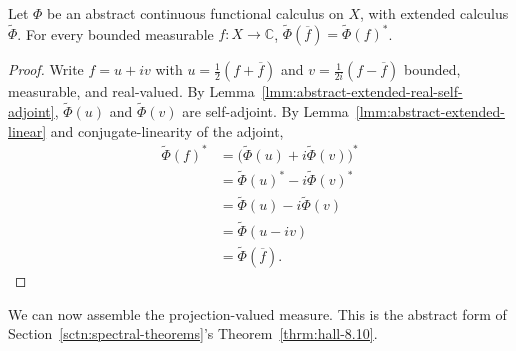 \begin{lemma}
    \label{lmm:abstract-extended-conjugation}
    \leanok
    Let $\Phi$ be an abstract continuous functional calculus on $X$, with extended calculus $\widetilde\Phi$. For every bounded measurable $f : X \to \mathbb{C}$, $\widetilde\Phi(\overline f) = \widetilde\Phi(f)^*$.
\end{lemma}
\begin{proof}
    \leanok
Write $f = u + iv$ with $u = \tfrac{1}{2}(f+\overline f)$ and $v = \tfrac{1}{2i}(f - \overline f)$ bounded, measurable, and real-valued. By Lemma~\ref{lmm:abstract-extended-real-self-adjoint}, $\widetilde\Phi(u)$ and $\widetilde\Phi(v)$ are self-adjoint. By Lemma~\ref{lmm:abstract-extended-linear} and conjugate-linearity of the adjoint,
\begin{align}
    \widetilde\Phi(f)^* &= \big( \widetilde\Phi(u) + i\widetilde\Phi(v) \big)^* \\
                &= \widetilde\Phi(u)^* - i\widetilde\Phi(v)^* \\
                &= \widetilde\Phi(u) - i\widetilde\Phi(v) \\
                &= \widetilde\Phi(u - iv) \\
                &= \widetilde\Phi(\overline f).
\end{align}
\end{proof}

We can now assemble the projection-valued measure. This is the abstract form of Section~\ref{sctn:spectral-theorems}'s Theorem~\ref{thrm:hall-8.10}.

